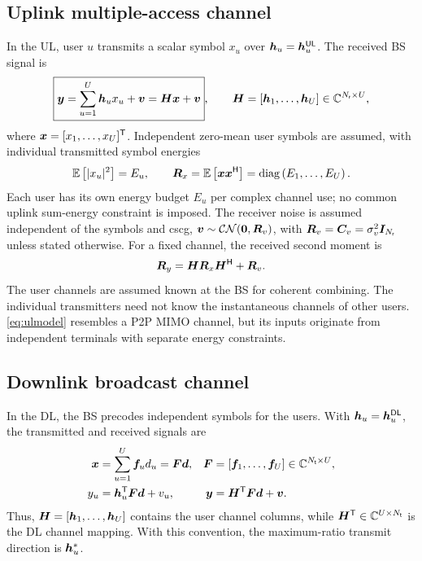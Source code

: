 \subsection{Uplink multiple-access channel}
In the UL, user $u$ transmits a scalar symbol $x_u$ over $\bm{h}_u=\bm{h}_u^{\mathsf{UL}}$. The received BS signal is
\begin{equation}
	\boxed{\bm{y}=\sum_{u=1}^{U}\bm{h}_u x_u+\bm{v}=\bm{H}\bm{x}+\bm{v}},\qquad
	\bm{H}=[\bm{h}_1,\ldots,\bm{h}_U]\in\mathbb{C}^{N_{\mathsf{r}}\times U},
	\label{eq:ulmodel}
\end{equation}
where $\bm{x}=[x_1,\ldots,x_U]^{\mathsf T}$. Independent zero-mean user symbols are assumed, with individual transmitted symbol energies
\begin{equation}
	\mathbb{E}\left[|x_u|^2\right]=E_u,\qquad
	\bm{R}_x=\mathbb{E}\left[\bm{x}{\bm{x}}^{\mathsf{H}}\right]=\operatorname{diag}\left(E_1,\ldots,E_U\right).
	\label{eq:ulenergy}
\end{equation}
Each user has its own energy budget $E_u$ per complex channel use; no common uplink sum-energy constraint is imposed. The receiver noise is assumed independent of the symbols and \ac{cscg}, $\bm{v}\sim\mathcal{CN}(\bm{0},\bm{R}_v)$, with $\bm{R}_v=\bm{C}_v=\sigma_v^2\bm{I}_{N_{\mathsf{r}}}$ unless stated otherwise. For a fixed channel, the received second moment is
\begin{equation}
	\bm{R}_y=\bm{H}\bm{R}_x{\bm{H}}^{\mathsf{H}}+\bm{R}_v.
	\label{eq:ulcov}
\end{equation}
The user channels are assumed known at the BS for coherent combining. The individual transmitters need not know the instantaneous channels of other users. \eqref{eq:ulmodel} resembles a P2P MIMO channel, but its inputs originate from independent terminals with separate energy constraints.

\subsection{Downlink broadcast channel}
In the DL, the BS precodes independent symbols for the users. With $\bm{h}_u=\bm{h}_u^{\mathsf{DL}}$, the transmitted and received signals are
\begin{align}
	\bm{x}&=\sum_{u=1}^{U}\bm{f}_u d_u=\bm{F}\bm{d},
	&\bm{F}&=[\bm{f}_1,\ldots,\bm{f}_U]\in\mathbb{C}^{N_{\mathsf{t}}\times U},\\
	y_u&={\bm{h}}^{\mathsf{T}}_u\bm{F}\bm{d}+v_u,
	&\bm{y}&={\bm{H}}^{\mathsf{T}}\bm{F}\bm{d}+\bm{v}.
	\label{eq:dlmodel}
\end{align}
Thus, $\bm{H}=[\bm{h}_1,\ldots,\bm{h}_U]$ contains the user channel columns, while ${\bm{H}}^{\mathsf{T}}\in\mathbb{C}^{U\times N_{\mathsf{t}}}$ is the DL channel mapping. With this convention, the maximum-ratio transmit direction is $\bm{h}_u^*$.


